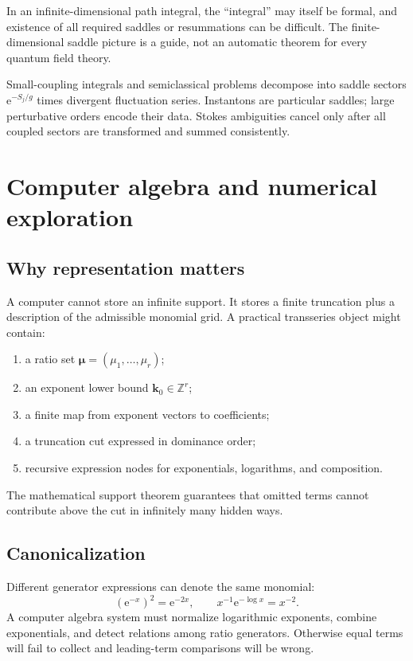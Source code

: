 \documentclass[11pt,oneside]{book}
\theoremstyle{definition}
\theoremstyle{remark}
\newcommand{\Z}{\mathbb{Z}}
\newcommand{\e}{\mathrm{e}}
\begin{document}
\begin{warningbox}
In an infinite-dimensional path integral, the ``integral'' may itself be formal,
and existence of all required saddles or resummations can be difficult. The
finite-dimensional saddle picture is a guide, not an automatic theorem for every
quantum field theory.
\end{warningbox}

\begin{summarybox}
Small-coupling integrals and semiclassical problems decompose into saddle sectors
$\e^{-S_j/g}$ times divergent fluctuation series. Instantons are particular
saddles; large perturbative orders encode their data. Stokes ambiguities cancel
only after all coupled sectors are transformed and summed consistently.
\end{summarybox}


\chapter{Computer algebra and numerical exploration}
\label{ch:computer-algebra}

\section{Why representation matters}

A computer cannot store an infinite support. It stores a finite truncation plus
a description of the admissible monomial grid. A practical transseries object
might contain:
\begin{enumerate}
\item a ratio set $\bm\mu=(\mu_1,\ldots,\mu_r)$;
\item an exponent lower bound $\bm k_0\in\Z^r$;
\item a finite map from exponent vectors to coefficients;
\item a truncation cut expressed in dominance order;
\item recursive expression nodes for exponentials, logarithms, and composition.
\end{enumerate}
The mathematical support theorem guarantees that omitted terms cannot contribute
above the cut in infinitely many hidden ways.

\section{Canonicalization}

Different generator expressions can denote the same monomial:
\[
  (\e^{-x})^2=\e^{-2x},
  \qquad
  x^{-1}\e^{-\log x}=x^{-2}.
\]
A computer algebra system must normalize logarithmic exponents, combine
exponentials, and detect relations among ratio generators. Otherwise equal terms
will fail to collect and leading-term comparisons will be wrong.
\end{document}
